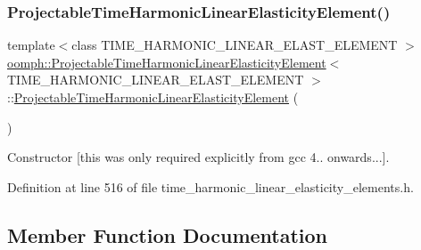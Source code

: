 \subsubsection{\texorpdfstring{Projectable\+Time\+Harmonic\+Linear\+Elasticity\+Element()}{ProjectableTimeHarmonicLinearElasticityElement()}}
{\footnotesize\ttfamily template$<$class T\+I\+M\+E\+\_\+\+H\+A\+R\+M\+O\+N\+I\+C\+\_\+\+L\+I\+N\+E\+A\+R\+\_\+\+E\+L\+A\+S\+T\+\_\+\+E\+L\+E\+M\+E\+NT $>$ \\
\hyperlink{classoomph_1_1ProjectableTimeHarmonicLinearElasticityElement}{oomph\+::\+Projectable\+Time\+Harmonic\+Linear\+Elasticity\+Element}$<$ T\+I\+M\+E\+\_\+\+H\+A\+R\+M\+O\+N\+I\+C\+\_\+\+L\+I\+N\+E\+A\+R\+\_\+\+E\+L\+A\+S\+T\+\_\+\+E\+L\+E\+M\+E\+NT $>$\+::\hyperlink{classoomph_1_1ProjectableTimeHarmonicLinearElasticityElement}{Projectable\+Time\+Harmonic\+Linear\+Elasticity\+Element} (\begin{DoxyParamCaption}{ }\end{DoxyParamCaption})\hspace{0.3cm}{\ttfamily [inline]}}



Constructor \mbox{[}this was only required explicitly from gcc 4.. onwards...\mbox{]}. 



Definition at line 516 of file time\+\_\+harmonic\+\_\+linear\+\_\+elasticity\+\_\+elements.\+h.



\subsection{Member Function Documentation}
\mbox{\label{classoomph_1_1ProjectableTimeHarmonicLinearElasticityElement_aa7e723386c104650e9b8f7f3e856786b}} 

